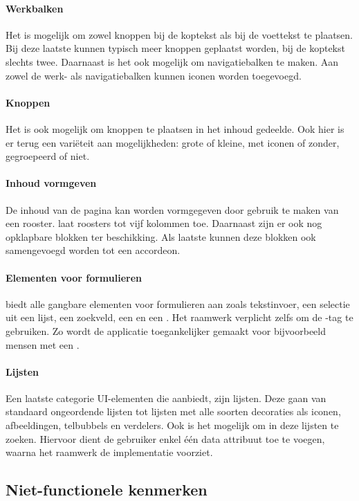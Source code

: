 \paragraph{Werkbalken}
Het is mogelijk om zowel knoppen bij de koptekst als bij de voettekst te plaatsen. 
Bij deze laatste kunnen typisch meer knoppen geplaatst worden, bij de koptekst slechts twee. 
Daarnaast is het ook mogelijk om navigatiebalken te maken. 
Aan zowel de werk- als navigatiebalken kunnen iconen worden toegevoegd.

\paragraph{Knoppen}
Het is ook mogelijk om knoppen te plaatsen in het inhoud gedeelde. 
Ook hier is er terug een variëteit aan mogelijkheden: grote of kleine, met iconen of zonder, gegroepeerd of niet. 

\paragraph{Inhoud vormgeven}
De inhoud van de pagina kan worden vormgegeven door gebruik te maken van een rooster. 
\jqm{} laat roosters tot vijf kolommen toe. 
Daarnaast zijn er ook nog opklapbare blokken ter beschikking. 
Als laatste kunnen deze blokken ook samengevoegd worden tot een accordeon. 

\paragraph{Elementen voor formulieren}
\jqm{} biedt alle gangbare elementen voor formulieren aan zoals tekstinvoer, een selectie uit een lijst, een zoekveld, een  en een . 
Het raamwerk verplicht zelfs om de -tag te gebruiken. 
Zo wordt de applicatie toegankelijker gemaakt voor bijvoorbeeld mensen met een .

\paragraph{Lijsten}
Een laatste categorie UI-elementen die \jqm{} aanbiedt, zijn lijsten. 
Deze gaan van standaard ongeordende lijsten tot lijsten met alle soorten decoraties als iconen, afbeeldingen, telbubbels en verdelers. 
Ook is het mogelijk om in deze lijsten te zoeken. 
Hiervoor dient de gebruiker enkel één data attribuut toe te voegen, waarna het raamwerk de implementatie voorziet. 

\subsection{Niet-functionele kenmerken}
